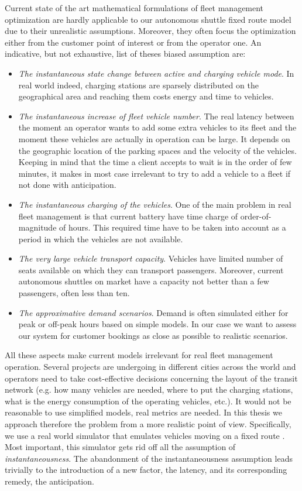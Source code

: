 \documentclass[12pt,a4paper]{article}
\begin{document}
Current state of the art mathematical formulations of fleet management optimization are hardly applicable to our autonomous shuttle fixed route model due to their unrealistic assumptions. Moreover, they often focus the optimization either from the customer point of interest or from the operator one. An indicative, but not exhaustive, list of theses biased assumption are:
\begin{itemize}
  \item \textit{The instantaneous state change between active and charging vehicle mode}. In real world indeed, charging stations are sparsely distributed on the geographical area and reaching them costs energy and time to vehicles.
  \item \textit{The instantaneous increase of fleet vehicle number}. The real latency between the moment an operator wants to add some extra vehicles to its fleet and the moment these vehicles are actually in operation can be large. It depends on the geographic location of the parking spaces and the velocity of the vehicles. Keeping in mind that the time a client accepts to wait is in the order of few minutes, it makes in most case irrelevant to try to add a vehicle to a fleet if not done with anticipation.
  \item \textit{The instantaneous charging of the vehicles}. One of the main problem in real fleet management is that current battery have time charge of order-of-magnitude of hours. This required time have to be taken into account as a period in which the vehicles are not available.
  \item \textit{The very large vehicle transport capacity}. Vehicles have limited number of seats available on which they can transport passengers. Moreover, current autonomous shuttles on market have a capacity not better than a few passengers, often less than ten.
    \item \textit{The approximative demand scenarios}. Demand is often simulated either for peak or off-peak hours based on simple models. In our case we want to assess our system for customer bookings as close as possible to realistic scenarios. 
\end{itemize}

All these aspects make current models irrelevant for real fleet management operation. Several projects are undergoing in different cities across the world and operators need to take cost-effective decisions concerning the layout of the transit network (e.g. how many vehicles are needed, where to put the charging stations, what is the energy consumption of the operating vehicles, etc.). It would not be reasonable to use simplified models, real metrics are needed. In this thesis we approach therefore the problem from a more realistic point of view. Specifically, we use a real world simulator that emulates vehicles moving on a fixed route . Most important, this simulator gets rid off all the assumption of \textit{instantaneousness}. The abandonment of the instantaneousness assumption leads trivially to the introduction of a new factor, the latency, and its corresponding remedy, the anticipation.
\end{document}
